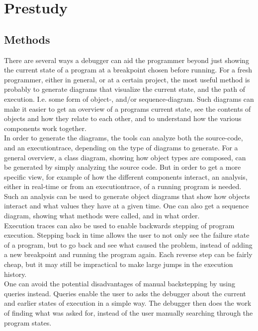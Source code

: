 \section{Prestudy}\label{prestudy}
\subsection{Methods}\label{preMethods}
There are several ways a debugger can aid the programmer beyond just showing the current state of a program at a \gls{breakpoint} chosen before running.
For a fresh programmer, either in general, or at a certain project, the most useful method is probably to generate diagrams that visualize the current state, and the path of execution.
I.e. some form of object-, and/or sequence-diagram.
Such diagrams can make it easier to get an overview of a programs current state, see the contents of objects and how they relate to each other, and to understand how the various components work together.
~\\

In order to generate the diagrams, the tools can analyze both the source-code, and an \gls{executiontrace}, depending on the type of diagrams to generate.
For a general overview, a class diagram, showing how object types are composed, can be generated by simply analyzing the source code.
But in order to get a more specific view, for example of how the different components interact, an analysis, either in real-time or from an \gls{executiontrace}, of a running program is needed.
Such an analysis can be used to generate object diagrams that show how objects interact and what values they have at a given time.
One can also get a sequence diagram, showing what methods were called, and in what order.
~\\

Execution traces can also be used to enable backwards stepping of program execution.
Stepping back in time allows the user to not only see the failure state of a program, but to go back and see what caused the problem, instead of adding a new \gls{breakpoint} and running the program again.
Each reverse step can be fairly cheap, but it may still be impractical to make large jumps in the execution history.
~\\

One can avoid the potential disadvantages of manual backstepping by using queries instead.
Queries enable the user to asks the debugger about the current and earlier states of execution in a simple way.
The debugger then does the work of finding what was asked for, instead of the user manually searching through the program states.
~\\

